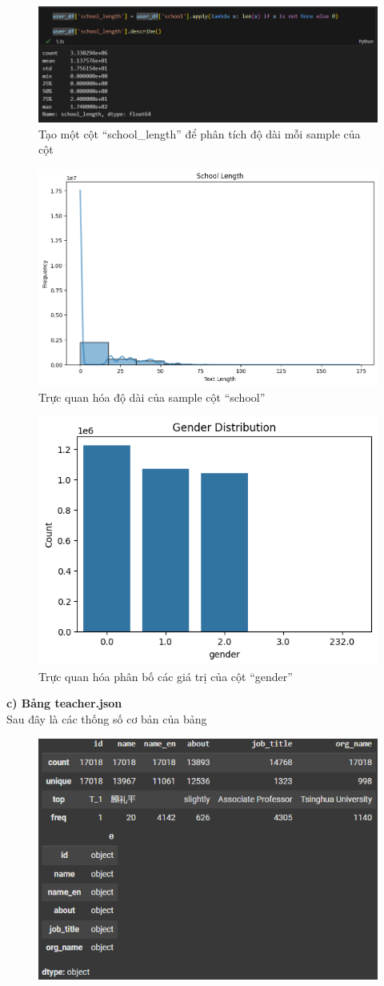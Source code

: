 \begin{figure}[h]
    \centering
    \includegraphics[width=1\linewidth]{figures/23.png}
    \caption{Tạo một cột “school\_length” để phân tích độ dài mỗi sample của cột}
\end{figure}
\newpage
\begin{figure}
    \centering
    \includegraphics[width=0.68\linewidth]{figures/24.png}
    \caption{Trực quan hóa độ dài của sample cột “school”}
\end{figure}
\begin{figure}[h]
    \centering
    \includegraphics[width=0.68\linewidth]{figures/25.png}
    \caption{Trực quan hóa phân bố các giá trị của cột “gender”}
\end{figure}
\newpage
\textbf{c) Bảng teacher.json}\\
Sau đây là các thống số cơ bản của bảng
\begin{figure}[h]
    \centering
    \includegraphics[width=0.6\linewidth]{figures/27.png}
\end{figure}\\
